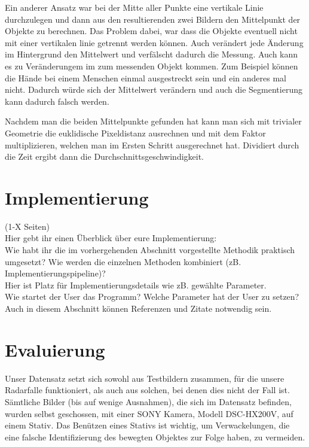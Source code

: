 \documentclass[deutsch]{scrartcl}
\begin{document}
Ein anderer Ansatz war bei der Mitte aller Punkte eine vertikale Linie durchzulegen und dann aus den resultierenden zwei Bildern den Mittelpunkt der Objekte zu berechnen. Das Problem dabei, war dass die Objekte eventuell nicht mit einer vertikalen linie getrennt werden können. Auch verändert jede Änderung im Hintergrund den Mittelwert und verfälscht dadurch die Messung. Auch kann es zu Veränderungem im zum messenden Objekt kommen. Zum Beispiel können die Hände bei einem Menschen einmal ausgestreckt sein und ein anderes mal nicht. Dadurch würde sich der Mittelwert verändern und auch die Segmentierung kann dadurch falsch werden.

Nachdem man die beiden Mittelpunkte gefunden hat kann man sich mit trivialer Geometrie die euklidische Pixeldistanz ausrechnen und mit dem Faktor multiplizieren, welchen man im Ersten Schritt ausgerechnet hat. Dividiert durch die Zeit ergibt dann die Durchschnittsgeschwindigkeit.


\section{Implementierung}
(1-X Seiten)\\
Hier gebt ihr einen Überblick über eure Implementierung:\\
Wie habt ihr die im vorhergehenden Abschnitt vorgestellte Methodik praktisch umgesetzt? Wie werden die einzelnen Methoden kombiniert (zB. Implementierungspipeline)?\\
Hier ist Platz für Implementierungsdetails wie zB. gewählte Parameter. \\
Wie startet der User das Programm? Welche Parameter hat der User zu setzen?\\
Auch in diesem Abschnitt können Referenzen und Zitate notwendig sein.\\

\section{Evaluierung}
Unser Datensatz setzt sich sowohl aus Testbildern zusammen, für die unsere Radarfalle funktioniert, als auch aus solchen, bei denen dies nicht der Fall ist. Sämtliche Bilder (bis auf wenige Ausnahmen), die sich im Datensatz befinden, wurden selbst geschossen, mit einer SONY Kamera, Modell DSC-HX200V, auf einem Stativ. Das Benützen eines Stativs ist wichtig, um Verwackelungen, die eine falsche Identifizierung des bewegten Objektes zur Folge haben, zu vermeiden.
\end{document}
